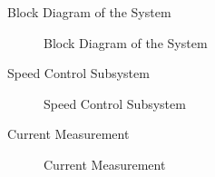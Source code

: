 \begin{frame}{Block Diagram of the System}
	\begin{figure}
		\centering

		\caption{Block Diagram of the System}
	\end{figure}
\end{frame}

\begin{frame}{Speed Control Subsystem}
	\begin{figure}
		\centering

		\caption{Speed Control Subsystem}
	\end{figure}
\end{frame}

\begin{frame}{Current Measurement}
	\begin{figure}
		\centering

		\caption{Current Measurement}
	\end{figure}
\end{frame}

